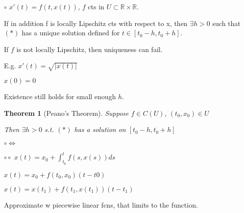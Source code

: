 \documentclass[twoside]{article}
\newcounter{lecnum}
\newtheorem{theorem}{Theorem}[lecnum]
\newcommand\R{\mathbb{R}}
\begin{document}
    $\circ$ $x'(t) = f(t, x(t))$, $f$ cts in $U \subset \R \times \R$. 

    If in addition f is locally Lipschitz cts with respect to x, then $\exists h > 0 $ such that $(*)$ has a unique solution defined for $t \in [t_0 - h, t_0 + h]$.

    If $f$ is not locally Lipschitz, then uniqueness can fail. 

    E.g. $x'(t) = \sqrt{|x(t)|}$

    $x(0) = 0$

    Existence still holds for small enough $h$. 

\begin{theorem} [Peano's Theorem]

    Suppose $f \in C(U)$, $(t_0, x_0) \in U$

    Then $\exists h > 0$ s.t. $(*)$ has a solution on $[t_0-h,t_0+h]$


\end{theorem}


$\circ \iff $

$\circ\circ$ $x(t) = x_0 + \int_{t_0}^t f(s, x(s)) ds$

$x(t) = x_0 + f(t_0, x_0)(t-t0)$

$x(t) = x(t_1) + f(t_1, x(t_1))(t-t_1)$

Approximate w piecewise linear fcns, that limits to the function. 
\end{document}
